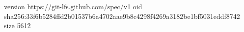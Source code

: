 version https://git-lfs.github.com/spec/v1
oid sha256:33f6b5284ffd2b01537b6a4702aae9b8c4298f4269a3182be1bf5031eddf8742
size 5612
